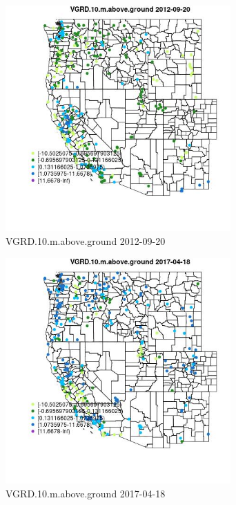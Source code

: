 \begin{figure} 
\centering  
\includegraphics[width=0.77\textwidth]{Code_Outputs/Report_ML_input_PM25_Step4_part_e_de_duplicated_aves_compiled_2019-05-14wNAs_MapObsVGRD10maboveground2012-09-20.jpg} 
\caption{\label{fig:Report_ML_input_PM25_Step4_part_e_de_duplicated_aves_compiled_2019-05-14wNAsMapObsVGRD10maboveground2012-09-20}VGRD.10.m.above.ground 2012-09-20} 
\end{figure} 
 

\begin{figure} 
\centering  
\includegraphics[width=0.77\textwidth]{Code_Outputs/Report_ML_input_PM25_Step4_part_e_de_duplicated_aves_compiled_2019-05-14wNAs_MapObsVGRD10maboveground2017-04-18.jpg} 
\caption{\label{fig:Report_ML_input_PM25_Step4_part_e_de_duplicated_aves_compiled_2019-05-14wNAsMapObsVGRD10maboveground2017-04-18}VGRD.10.m.above.ground 2017-04-18} 
\end{figure} 
 

